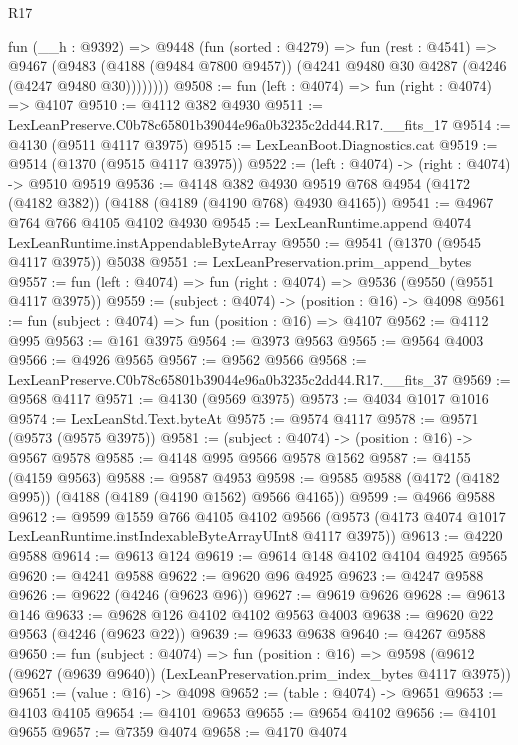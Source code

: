 \begin{lexlean}{R17}
\begin{coremodule}
        fun (__h : @9392) =>
        @9448
          (fun (sorted : @4279) =>
          fun (rest : @4541) =>
          @9467
            (@9483
              (@4188 (@9484 @7800 @9457))
              (@4241 @9480 @30 @4287 (@4246 (@4247 @9480 @30))))))))
@9508 := fun (left : @4074) => fun (right : @4074) => @4107
@9510 := @4112 @382 @4930
@9511 := LexLeanPreserve.C0b78c65801b39044e96a0b3235c2dd44.R17.__fits_17
@9514 := @4130 (@9511 @4117 @3975)
@9515 := LexLeanBoot.Diagnostics.cat
@9519 := @9514 (@1370 (@9515 @4117 @3975))
@9522 := (left : @4074) -> (right : @4074) -> @9510 @9519
@9536 := @4148
    @382
    @4930
    @9519
    @768
    @4954
    (@4172 (@4182 @382))
    (@4188 (@4189 (@4190 @768) @4930 @4165))
@9541 := @4967 @764 @766 @4105 @4102 @4930
@9545 := LexLeanRuntime.append @4074 LexLeanRuntime.instAppendableByteArray
@9550 := @9541 (@1370 (@9545 @4117 @3975)) @5038
@9551 := LexLeanPreservation.prim_append_bytes
@9557 := fun (left : @4074) => fun (right : @4074) => @9536 (@9550 (@9551 @4117 @3975))
@9559 := (subject : @4074) -> (position : @16) -> @4098
@9561 := fun (subject : @4074) => fun (position : @16) => @4107
@9562 := @4112 @995
@9563 := @161 @3975
@9564 := @3973 @9563
@9565 := @9564 @4003
@9566 := @4926 @9565
@9567 := @9562 @9566
@9568 := LexLeanPreserve.C0b78c65801b39044e96a0b3235c2dd44.R17.__fits_37
@9569 := @9568 @4117
@9571 := @4130 (@9569 @3975)
@9573 := @4034 @1017 @1016
@9574 := LexLeanStd.Text.byteAt
@9575 := @9574 @4117
@9578 := @9571 (@9573 (@9575 @3975))
@9581 := (subject : @4074) -> (position : @16) -> @9567 @9578
@9585 := @4148 @995 @9566 @9578 @1562
@9587 := @4155 (@4159 @9563)
@9588 := @9587 @4953
@9598 := @9585 @9588 (@4172 (@4182 @995)) (@4188 (@4189 (@4190 @1562) @9566 @4165))
@9599 := @4966 @9588
@9612 := @9599
    @1559
    @766
    @4105
    @4102
    @9566
    (@9573 (@4173 @4074 @1017 LexLeanRuntime.instIndexableByteArrayUInt8 @4117 @3975))
@9613 := @4220 @9588
@9614 := @9613 @124
@9619 := @9614 @148 @4102 @4104 @4925 @9565
@9620 := @4241 @9588
@9622 := @9620 @96 @4925
@9623 := @4247 @9588
@9626 := @9622 (@4246 (@9623 @96))
@9627 := @9619 @9626
@9628 := @9613 @146
@9633 := @9628 @126 @4102 @4102 @9563 @4003
@9638 := @9620 @22 @9563 (@4246 (@9623 @22))
@9639 := @9633 @9638
@9640 := @4267 @9588
@9650 := fun (subject : @4074) =>
  fun (position : @16) =>
  @9598 (@9612 (@9627 (@9639 @9640)) (LexLeanPreservation.prim_index_bytes @4117 @3975))
@9651 := (value : @16) -> @4098
@9652 := (table : @4074) -> @9651
@9653 := @4103 @4105
@9654 := @4101 @9653
@9655 := @9654 @4102
@9656 := @4101 @9655
@9657 := @7359 @4074
@9658 := @4170 @4074

\end{coremodule}
\end{lexlean}
